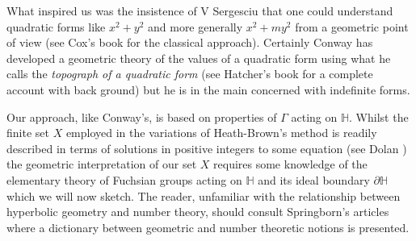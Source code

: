 \documentclass[12pt,a4paper]{amsart}
\begin{document}
What inspired us was the insistence of V Sergesciu that one could
understand quadratic forms like $x^2 +y^2$ and more generally $x^2 + my^2$
from a geometric point of view (see Cox's book \cite{cox} for the classical approach).
Certainly Conway \cite{conway} has developed a geometric theory of 
the values of a quadratic form using what he calls the
\textit{topograph of a quadratic form}
(see Hatcher's book \cite{hatcher} for a complete account with back
ground)
but he is in the main concerned with indefinite forms.

Our approach, like Conway's, is based on properties of $\Gamma$ acting on $\mathbb{H}$.
Whilst the finite set $X$ employed in the variations of
Heath-Brown's method is readily described in terms of solutions
in positive integers to some equation (see  Dolan \cite{dolan}) 
the geometric interpretation of our set $X$ requires some knowledge
of the elementary theory of Fuchsian groups acting on $\mathbb{H}$ and
its ideal boundary $\partial \mathbb{H}$ which we will now sketch.
The reader, unfamiliar with the relationship between hyperbolic
geometry and number theory,
should consult Springborn's articles \cite{springborn1, springborn2}
where a dictionary between geometric and number theoretic notions is presented.
\end{document}
